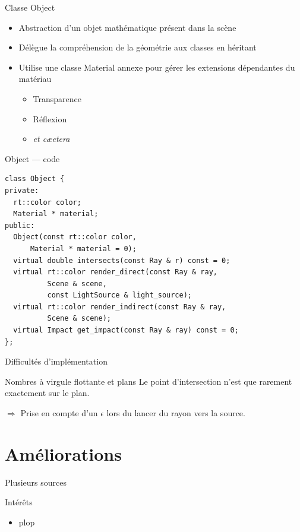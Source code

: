 \documentclass{beamer}
\begin{document}
\begin{frame}{Classe Object}
    \begin{itemize}
        \item Abstraction d'un objet mathématique présent dans la scène
        \item Délègue la compréhension de la géométrie aux classes en héritant
        \item Utilise une classe Material annexe pour gérer les extensions dépendantes du matériau
            \begin{itemize}
                \item Transparence
                \item Réflexion
                \item \emph{et cæetera}
            \end{itemize}
    \end{itemize}
\end{frame}

\begin{frame}[fragile]{Object — code}
    \begin{lstlisting}
class Object {
private:
  rt::color color;
  Material * material;
public:
  Object(const rt::color color,
      Material * material = 0);
  virtual double intersects(const Ray & r) const = 0;
  virtual rt::color render_direct(const Ray & ray,
          Scene & scene,
          const LightSource & light_source);
  virtual rt::color render_indirect(const Ray & ray,
          Scene & scene);
  virtual Impact get_impact(const Ray & ray) const = 0;
};
\end{lstlisting}
\end{frame}

\begin{frame}{Difficultés d'implémentation}
\begin{block}{Nombres à virgule flottante et plans}
    Le point d'intersection n'est que rarement exactement sur le plan.

    $\Rightarrow$ Prise en compte d'un $\epsilon$ lors du lancer du rayon vers la source.
\end{block}
\end{frame}

\section{Améliorations}

\begin{frame}{Plusieurs sources}
\begin{block}{Intérêts}
\begin{itemize}
\item plop
\end{itemize}

\end{block}

\end{frame}
\end{document}

